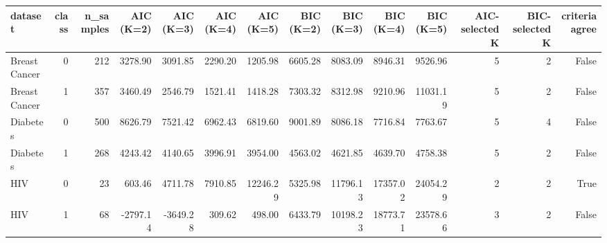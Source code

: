 \begin{tabular}{lrrrrrrrrrrrrr}
\toprule
dataset & class & n_samples & AIC (K=2) & AIC (K=3) & AIC (K=4) & AIC (K=5) & BIC (K=2) & BIC (K=3) & BIC (K=4) & BIC (K=5) & AIC-selected K & BIC-selected K & criteria agree \\
\midrule
Breast Cancer & 0 & 212 & 3278.90 & 3091.85 & 2290.20 & 1205.98 & 6605.28 & 8083.09 & 8946.31 & 9526.96 & 5 & 2 & False \\
Breast Cancer & 1 & 357 & 3460.49 & 2546.79 & 1521.41 & 1418.28 & 7303.32 & 8312.98 & 9210.96 & 11031.19 & 5 & 2 & False \\
Diabetes & 0 & 500 & 8626.79 & 7521.42 & 6962.43 & 6819.60 & 9001.89 & 8086.18 & 7716.84 & 7763.67 & 5 & 4 & False \\
Diabetes & 1 & 268 & 4243.42 & 4140.65 & 3996.91 & 3954.00 & 4563.02 & 4621.85 & 4639.70 & 4758.38 & 5 & 2 & False \\
HIV & 0 & 23 & 603.46 & 4711.78 & 7910.85 & 12246.29 & 5325.98 & 11796.13 & 17357.02 & 24054.29 & 2 & 2 & True \\
HIV & 1 & 68 & -2797.14 & -3649.28 & 309.62 & 498.00 & 6433.79 & 10198.23 & 18773.71 & 23578.66 & 3 & 2 & False \\
\bottomrule
\end{tabular}
